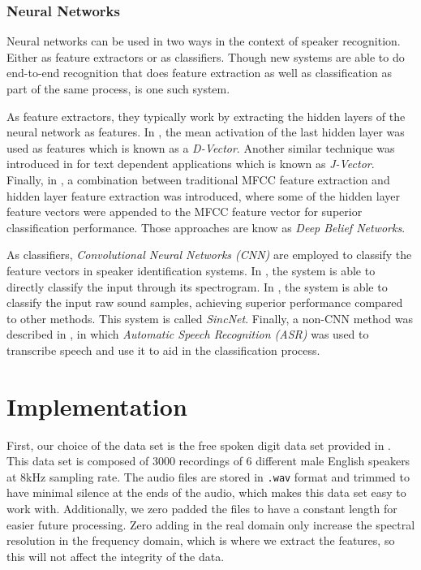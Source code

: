 \documentclass[twocolumn]{article}
\begin{document}
\subsubsection{Neural Networks}

Neural networks can be used in two ways in the context of speaker recognition.
Either as feature extractors or as classifiers. Though new systems are able to
do end-to-end recognition that does feature extraction as well as
classification as part of the same process, \autocite{Heigold2016} is one such
system.

As feature extractors, they typically work by extracting the hidden layers of
the neural network as features. In \autocite{Variani2014}, the mean activation
of the last hidden layer was used as features which is known as a
\emph{D-Vector}. Another similar technique was introduced in
\autocite{Chen2015} for text dependent applications which is known as
\emph{J-Vector}. Finally, in \autocite{Banerjee2018}, a combination between
traditional MFCC feature extraction and hidden layer feature extraction was
introduced, where some of the hidden layer feature vectors were appended to the
MFCC feature vector for superior classification performance. Those approaches
are know as \emph{Deep Belief Networks}.

As classifiers, \emph{Convolutional Neural Networks (CNN)} are employed to
classify the feature vectors in speaker identification systems.  In
\autocite{Hajavi2019}, the system is able to directly classify the input
through its spectrogram. In \autocite{Ravanelli2018}, the system is able to
classify the input raw sound samples, achieving superior performance compared
to other methods. This system is called \emph{SincNet}. Finally, a non-CNN
method was described in \autocite{Toshniwal2017}, in which \emph{Automatic
Speech Recognition (ASR)} was used to transcribe speech and use it to aid in
the classification process.

\section{Implementation}
\label{sec:Implementation}

First, our choice of the data set is the free spoken digit data set provided in
\autocite{Zohar2018}. This data set is composed of 3000 recordings of 6
different male English speakers at 8kHz sampling rate. The audio files are
stored in \texttt{.wav} format and trimmed to have minimal silence at the ends
of the audio, which makes this data set easy to work with. Additionally, we
zero padded the files to have a constant length for easier future processing.
Zero adding in the real domain only increase the spectral resolution in the
frequency domain, which is where we extract the features, so this will not
affect the integrity of the data.
\end{document}

